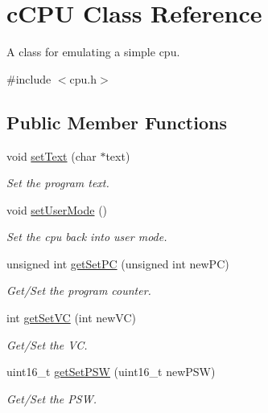 \hypertarget{classcCPU}{\section{c\-C\-P\-U \-Class \-Reference}
\label{d2/dc6/classcCPU}
}


\-A class for emulating a simple cpu.  




{\ttfamily \#include $<$cpu.\-h$>$}

\subsection*{\-Public \-Member \-Functions}
\begin{DoxyCompactItemize}
\item 
void \hyperlink{classcCPU_acd957640be8abb7c0d8a24010ed0e737}{set\-Text} (char $\ast$text)
\begin{DoxyCompactList}\small\item\em \-Set the program text. \end{DoxyCompactList}\item 
void \hyperlink{classcCPU_a176eb207069b99c47ddec6b466d1a92b}{set\-User\-Mode} ()
\begin{DoxyCompactList}\small\item\em \-Set the cpu back into user mode. \end{DoxyCompactList}\item 
unsigned int \hyperlink{classcCPU_ab04938ac939d530e521181db6a52944f}{get\-Set\-P\-C} (unsigned int new\-P\-C)
\begin{DoxyCompactList}\small\item\em \-Get/\-Set the program counter. \end{DoxyCompactList}\item 
int \hyperlink{classcCPU_a2d593a0d3d66e532826db4754d5fc4d2}{get\-Set\-V\-C} (int new\-V\-C)
\begin{DoxyCompactList}\small\item\em \-Get/\-Set the \-V\-C. \end{DoxyCompactList}\item 
uint16\-\_\-t \hyperlink{classcCPU_a0b13774a76c6b04d760b8ff072c37a85}{get\-Set\-P\-S\-W} (uint16\-\_\-t new\-P\-S\-W)
\begin{DoxyCompactList}\small\item\em \-Get/\-Set the \-P\-S\-W. \end{DoxyCompactList}\item 

\end{DoxyCompactItemize}
